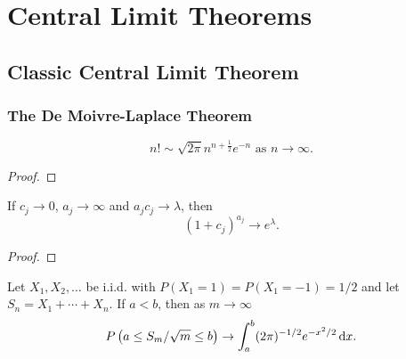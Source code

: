 \chapter{Central Limit Theorems}


\section{Classic Central Limit Theorem}

\subsection{The De Moivre-Laplace Theorem}

\begin{lemma} \label{lem:stirling}
	\begin{equation}
		n ! \sim \sqrt{2 \pi} n^{n+\frac{1}{2}} e^{-n} \text{ as } n \rightarrow \infty.
	\end{equation}
\end{lemma}

\begin{proof}

\end{proof}

\begin{lemma} \label{lem:exp}
	If $c_j\rightarrow 0$, $a_j\rightarrow\infty$ and $a_jc_j\rightarrow\lambda$, then
	\begin{equation}
		\left(1+c_j\right)^{a_j}\rightarrow e^\lambda.
	\end{equation}
\end{lemma}

\begin{proof}

\end{proof}

\begin{theorem} \label{thm:de-moivre-laplace}
	Let $X_{1}, X_{2}, \ldots$ be i.i.d. with $P\left(X_{1}=1\right)=P\left(X_{1}=-1\right)=1 / 2$ and let $S_{n}=X_{1}+\cdots+X_{n}$. If $a<b$, then as $m \rightarrow \infty$
	\begin{equation}
		P\left(a \leq S_{m} / \sqrt{m} \leq b\right) \rightarrow \int_{a}^{b}(2 \pi)^{-1 / 2} e^{-x^{2} / 2} \mathop{}\!\mathrm{d} x.
	\end{equation}
\end{theorem}

